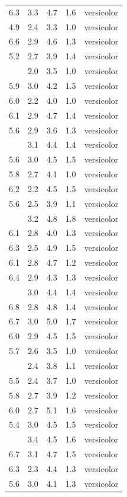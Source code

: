\documentclass[12pt,]{krantz}
\theoremstyle{definition}
\theoremstyle{definition}
\theoremstyle{definition}
\theoremstyle{remark}
\begin{document}
\begin{longtable}[t]{rrrrl}
6.3 & 3.3 & 4.7 & 1.6 & versicolor\\
4.9 & 2.4 & 3.3 & 1.0 & versicolor\\
6.6 & 2.9 & 4.6 & 1.3 & versicolor\\
5.2 & 2.7 & 3.9 & 1.4 & versicolor\\
\addlinespace
5.0 & 2.0 & 3.5 & 1.0 & versicolor\\
5.9 & 3.0 & 4.2 & 1.5 & versicolor\\
6.0 & 2.2 & 4.0 & 1.0 & versicolor\\
6.1 & 2.9 & 4.7 & 1.4 & versicolor\\
5.6 & 2.9 & 3.6 & 1.3 & versicolor\\
\addlinespace
6.7 & 3.1 & 4.4 & 1.4 & versicolor\\
5.6 & 3.0 & 4.5 & 1.5 & versicolor\\
5.8 & 2.7 & 4.1 & 1.0 & versicolor\\
6.2 & 2.2 & 4.5 & 1.5 & versicolor\\
5.6 & 2.5 & 3.9 & 1.1 & versicolor\\
\addlinespace
5.9 & 3.2 & 4.8 & 1.8 & versicolor\\
6.1 & 2.8 & 4.0 & 1.3 & versicolor\\
6.3 & 2.5 & 4.9 & 1.5 & versicolor\\
6.1 & 2.8 & 4.7 & 1.2 & versicolor\\
6.4 & 2.9 & 4.3 & 1.3 & versicolor\\
\addlinespace
6.6 & 3.0 & 4.4 & 1.4 & versicolor\\
6.8 & 2.8 & 4.8 & 1.4 & versicolor\\
6.7 & 3.0 & 5.0 & 1.7 & versicolor\\
6.0 & 2.9 & 4.5 & 1.5 & versicolor\\
5.7 & 2.6 & 3.5 & 1.0 & versicolor\\
\addlinespace
5.5 & 2.4 & 3.8 & 1.1 & versicolor\\
5.5 & 2.4 & 3.7 & 1.0 & versicolor\\
5.8 & 2.7 & 3.9 & 1.2 & versicolor\\
6.0 & 2.7 & 5.1 & 1.6 & versicolor\\
5.4 & 3.0 & 4.5 & 1.5 & versicolor\\
\addlinespace
6.0 & 3.4 & 4.5 & 1.6 & versicolor\\
6.7 & 3.1 & 4.7 & 1.5 & versicolor\\
6.3 & 2.3 & 4.4 & 1.3 & versicolor\\
5.6 & 3.0 & 4.1 & 1.3 & versicolor\\

\end{longtable}
\end{document}
